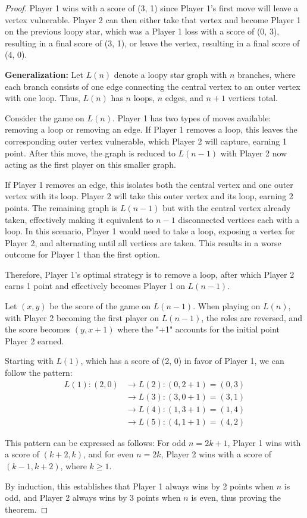 \documentclass{article}
\begin{document}
\begin{proof}
Player 1 wins with a score of (3, 1) since Player 1's first move will leave a vertex vulnerable. Player 2 can then either take that vertex and become Player 1 on the previous loopy star, which was a Player 1 loss with a score of (0, 3), resulting in a final score of (3, 1), or leave the vertex, resulting in a final score of (4, 0).

\textbf{Generalization:} Let $L(n)$ denote a loopy star graph with $n$ branches, where each branch consists of one edge connecting the central vertex to an outer vertex with one loop. Thus, $L(n)$ has $n$ loops, $n$ edges, and $n+1$ vertices total.

Consider the game on $L(n)$. Player 1 has two types of moves available: removing a loop or removing an edge. If Player 1 removes a loop, this leaves the corresponding outer vertex vulnerable, which Player 2 will capture, earning 1 point. After this move, the graph is reduced to $L(n-1)$ with Player 2 now acting as the first player on this smaller graph.

If Player 1 removes an edge, this isolates both the central vertex and one outer vertex with its loop. Player 2 will take this outer vertex and its loop, earning 2 points. The remaining graph is $L(n-1)$ but with the central vertex already taken, effectively making it equivalent to $n-1$ disconnected vertices each with a loop. In this scenario, Player 1 would need to take a loop, exposing a vertex for Player 2, and alternating until all vertices are taken. This results in a worse outcome for Player 1 than the first option.

Therefore, Player 1's optimal strategy is to remove a loop, after which Player 2 earns 1 point and effectively becomes Player 1 on $L(n-1)$.

Let $(x, y)$ be the score of the game on $L(n-1)$. When playing on $L(n)$, with Player 2 becoming the first player on $L(n-1)$, the roles are reversed, and the score becomes $(y, x+1)$ where the "+1" accounts for the initial point Player 2 earned.

Starting with $L(1)$, which has a score of (2, 0) in favor of Player 1, we can follow the pattern:
\begin{align*}
L(1): (2, 0) &\rightarrow L(2): (0, 2+1) = (0, 3) \\
&\rightarrow L(3): (3, 0+1) = (3, 1) \\
&\rightarrow L(4): (1, 3+1) = (1, 4) \\
&\rightarrow L(5): (4, 1+1) = (4, 2)
\end{align*}

This pattern can be expressed as follows: For odd $n = 2k+1$, Player 1 wins with a score of $(k+2, k)$, and for even $n = 2k$, Player 2 wins with a score of $(k-1, k+2)$, where $k \geq 1$.

By induction, this establishes that Player 1 always wins by 2 points when $n$ is odd, and Player 2 always wins by 3 points when $n$ is even, thus proving the theorem.
\end{proof}
\end{document}
